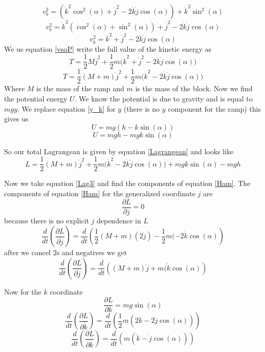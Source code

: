 \documentclass[11pt]{article}
\numberwithin{equation}{section}
\newcommand{\partdj}{\frac{\partial L}{\partial \dot{j}}}
\newcommand{\partj}{\frac{\partial L}{\partial j}}
\newcommand{\partdk}{\frac{\partial L}{\partial \dot{k}}}
\newcommand{\partk}{\frac{\partial L}{\partial k}}
\begin{document}
$$v_b^2 =(\dot{k}^2\cos^2{(\alpha)} + \dot{j}^2 -2\dot{k}\dot{j}\cos{(\alpha)}) + \dot{k}^2\sin^2{(\alpha)}$$
$$v_b^2 =\dot{k}^2(\cos^2{(\alpha)} + \sin^2{(\alpha)}) + \dot{j}^2 -2\dot{k}\dot{j}\cos{(\alpha)} $$
\begin{equation}
v_b^2 =\dot{k}^2 + \dot{j}^2 - 2\dot{k}\dot{j}\cos{(\alpha)} 
\label{vsq}
\end{equation}
We us equation \ref{vsqP} write the full value of the kinetic energy as
$$T = \frac{1}{2}M\dot{j}^2 + \frac{1}{2}m(\dot{k}^2 + \dot{j}^2 - 2\dot{k}\dot{j}\cos{(\alpha))} $$
\begin{equation}
T = \frac{1}{2}(M+m)\dot{j}^2 + \frac{1}{2}m(\dot{k}^2 - 2\dot{k}\dot{j}\cos{(\alpha))} 
\label{KinEn3}
\end{equation}
Where $M$ is the mass of the ramp and $m$ is the mass of the block. Now we find the potential energy $U$. We know the potential is due to gravity and is equal to $mgy$. We replace equation \ref{y_k} for $y$ (there is no $y$ component for the ramp) this gives us
$$U = m g (h - k \sin{(\alpha)})$$
\begin{equation}
U = m g h - m g k \sin{(\alpha)}
\label{PotEn3}
\end{equation}

So our total Lagrangean is given by equation \ref{Lagrangean} and looks like
\begin{equation}
L = \frac{1}{2}(M+m)\dot{j}^2 + \frac{1}{2}m(\dot{k}^2 - 2\dot{k}\dot{j}\cos{(\alpha))} + m g k \sin{(\alpha)} - mgh
\label{Lag3}
\end{equation}

Now we take equation \ref{Lag3} and find the components of equation \ref{Ham}. The components of equation \ref{Ham} for the generalized coordinate $j$ are
\begin{equation}
\partj = 0
\label{dLdj}
\end{equation}
because there is no explicit $j$ dependence in $L$
$$\frac{d}{dt}\left(\partdj\right) = \frac{d}{dt}\left(\frac{1}{2}(M +m)(2\dot{j}) - \frac{1}{2}m(-2\dot{k}\cos{(\alpha)}\right)$$
after we cancel $2$s and negatives we get
\begin{equation}
\frac{d}{dt}\left(\partdj\right) = \frac{d}{dt}\left((M +m)\dot{j} +  m(\dot{k}\cos{(\alpha)}\right)
\label{dLddj}
\end{equation}

Now for the $k$ coordinate
\begin{equation}
\partk = mg\sin{(\alpha)}
\label{dLdk}
\end{equation}
$$\frac{d}{dt}\left(\partdk\right) = \frac{d}{dt}\left(\frac{1}{2}m(2\dot{k} - 2\dot{j}\cos{(\alpha)})\right)$$
$$\frac{d}{dt}\left(\partdk\right) = \frac{d}{dt}\left(m(\dot{k} - \dot{j}\cos{(\alpha)})\right)$$
\end{document}
